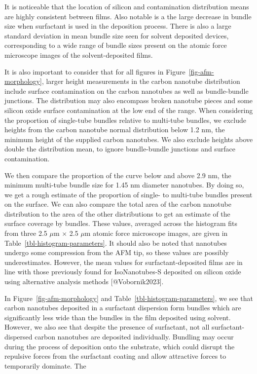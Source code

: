 \documentclass[
  letterpaper,
  DIV=11,
  numbers=noendperiod]{scrartcl}
\begin{document}
It is noticeable that the location of silicon and contamination
distribution means are highly consistent between films. Also notable is
a the large decrease in bundle size when surfactant is used in the
deposition process. There is also a large standard deviation in mean
bundle size seen for solvent deposited devices, corresponding to a wide
range of bundle sizes present on the atomic force microscope images of
the solvent-deposited films.

It is also important to consider that for all figures in
Figure~\ref{fig-afm-morphology}, larger height measurements in the
carbon nanotube distribution include surface contamination on the carbon
nanotubes as well as bundle-bundle junctions. The distribution may also
encompass broken nanotube pieces and some silicon oxide surface
contamination at the low end of the range. When considering the
proportion of single-tube bundles relative to multi-tube bundles, we
exclude heights from the carbon nanotube normal distribution below 1.2
nm, the minimum height of the supplied carbon nanotubes. We also exclude
heights above double the distribution mean, to ignore bundle-bundle
junctions and surface contamination.

We then compare the proportion of the curve below and above 2.9 nm, the
minimum multi-tube bundle size for 1.45 nm diameter nanotubes. By doing
so, we get a rough estimate of the proportion of single- to multi-tube
bundles present on the surface. We can also compare the total area of
the carbon nanotube distribution to the area of the other distributions
to get an estimate of the surface coverage by bundles. These values,
averaged across the histogram fits from three 2.5 \(\mu\)m \(\times\)
2.5 \(\mu\)m atomic force microscope images, are given in
Table~\ref{tbl-histogram-parameters}. It should also be noted that
nanotubes undergo some compression from the AFM tip, so these values are
possibly underestimates. However, the mean values for
surfactant-deposited films are in line with those previously found for
IsoNanotubes-S deposited on silicon oxide using alternative analysis
methods {[}@Vobornik2023{]}.

In Figure~\ref{fig-afm-morphology} and
Table~\ref{tbl-histogram-parameters}, we see that carbon nanotubes
deposited in a surfactant dispersion form bundles which are
significantly less wide than the bundles in the film deposited using
solvent. However, we also see that despite the presence of surfactant,
not all surfactant-dispersed carbon nanotubes are deposited
individually. Bundling may occur during the process of deposition onto
the substrate, which could disrupt the repulsive forces from the
surfactant coating and allow attractive forces to temporarily dominate.
The
\end{document}
